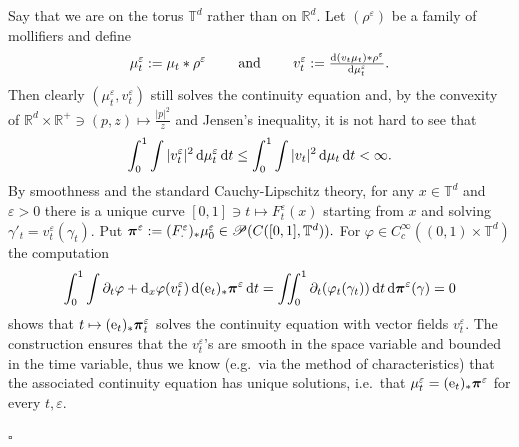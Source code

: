 \documentclass[11pt]{article}
\numberwithin{equation}{section}
\newenvironment{idea}{\removelastskip\par\medskip   %
\noindent{\em Idea of the proof} \rm}{\penalty-20\null\hfill$\square$\par\medbreak}
\newcommand{\R}{\mathbb{R}}
\newcommand{\ppi}{{\mbox{\boldmath$\pi$}}}
\newcommand{\pr}{\mathscr P}
\newcommand{\e}{{\rm e}}
\renewcommand{\d}{{\rm d}}
\newcommand{\eps}{\varepsilon}
\newcommand{\T}{\mathbb T}
\begin{document}
\begin{idea} Say that we are on the torus $\T^d$ rather than on $\R^d$. Let $(\rho^\eps)$ be a family of mollifiers and define
\[
\mu^\eps_t:=\mu_t\ast\rho^\eps\qquad\text{ and }\qquad v^\eps_t:=\tfrac{\d(v_t\mu_t)\ast\rho^\eps}{\d\mu^\eps_t}.
\]
Then clearly $(\mu^\eps_t,v^\eps_t)$ still solves the continuity equation and, by the convexity of $\R^d\times\R^+\ni (p,z)\mapsto\frac{|p|^2}z$ and Jensen's inequality, it is not hard to see that 
\begin{equation}
\label{eq:unifke}
 \int_0^1\int|v^\eps_t|^2\,\d\mu^\eps_t\,\d t\leq  \int_0^1\int|v_t|^2\,\d\mu_t\,\d t<\infty.
\end{equation}
By smoothness and the standard Cauchy-Lipschitz theory, for any $x\in\T^d$ and $\eps>0$ there is a unique curve $[0,1]\ni t\mapsto F^\eps_t(x)$ starting from $x$ and solving $\gamma'_t=v^\eps_t(\gamma_t)$. Put $\ppi^\eps:= (F^\eps_\cdot)_*\mu^\eps_0\in \pr(C([0,1],\T^d)).$ For $\varphi\in C^\infty_c((0,1)\times\T^d)$ the computation
\[
\begin{split}
\int_0^1\int \partial_t\varphi+\d_x\varphi(v_t^\eps)\,\d (\e_t)_*\ppi^\eps\,\d t=\iint_0^1 \partial_t(\varphi_t(\gamma_t))\,\d t\,\d\ppi^\eps(\gamma)=0
\end{split}
\]
shows that $t\mapsto(\e_t)_*\ppi^\eps_t$  solves the continuity equation with vector fields $v^\eps_t$. The construction ensures that the $v^\eps_t$'s are smooth in the space variable and bounded in the time variable, thus we know  (e.g.\ via the method of characteristics) that the associated continuity equation has unique solutions, i.e.\ that $\mu^\eps_t=(\e_t)_*\ppi^\eps$ for every $t,\eps$. 


\end{idea}
\end{document}
